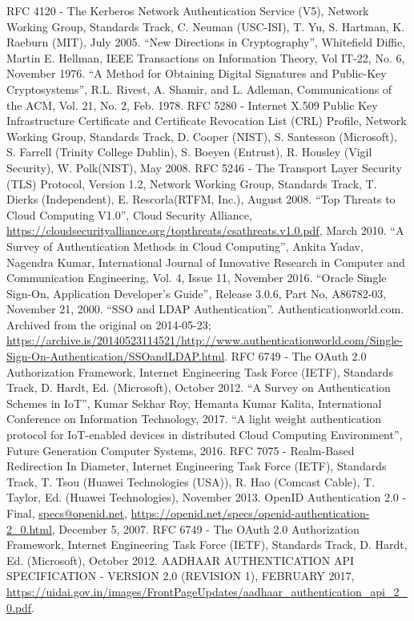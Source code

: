 \begin{multicols}{2}
\begin{thebibliography}{99}
 RFC 4120 - The Kerberos Network Authentication Service (V5), Network Working Group, Standards Track, C. Neuman (USC-ISI), T. Yu, S. Hartman, K. Raeburn (MIT), July 2005.
 ``New Directions in Cryptography'', Whitefield Diffie, Martin E. Hellman, IEEE Transactions on Information Theory, Vol IT-22, No. 6, November 1976.
 ``A Method for Obtaining Digital Signatures and Public-Key Cryptosystems'', R.L. Rivest, A. Shamir, and L. Adleman, Communications of the ACM, Vol. 21, No. 2, Feb. 1978.
 RFC 5280 - Internet X.509 Public Key Infrastructure Certificate and Certificate Revocation List (CRL) Profile, Network Working Group, Standards Track, D. Cooper (NIST), S. Santesson (Microsoft), S. Farrell (Trinity College Dublin), S. Boeyen (Entrust), R. Housley (Vigil Security), W. Polk(NIST), May 2008.
 RFC 5246 - The Transport Layer Security (TLS) Protocol, Version 1.2, Network Working Group, Standards Track, T. Dierks (Independent), E. Rescorla(RTFM, Inc.), August 2008.
 ``Top Threats to Cloud Computing V1.0'', Cloud Security Alliance, \url{https://cloudsecurityalliance.org/topthreats/csathreats.v1.0.pdf}, March 2010.
 ``A Survey of Authentication Methods in Cloud Computing'', Ankita Yadav, Nagendra Kumar, International Journal of Innovative Research in Computer and Communication Engineering, Vol. 4, Issue 11, November 2016.
 ``Oracle Single Sign-On, Application Developer's Guide'', Release 3.0.6, Part No, A86782-03, November 21, 2000.
 ``SSO and LDAP Authentication''. Authenticationworld.com. Archived from the original on 2014-05-23; \url{https://archive.is/20140523114521/http://www.authenticationworld.com/Single-Sign-On-Authentication/SSOandLDAP.html}.
 RFC 6749 - The OAuth 2.0 Authorization Framework, Internet Engineering Task Force (IETF), Standards Track, D. Hardt, Ed. (Microsoft), October 2012.
 ``A Survey on Authentication Schemes in IoT'', Kumar Sekhar Roy, Hemanta Kumar Kalita, International Conference on Information Technology, 2017.
 ``A light weight authentication protocol for IoT-enabled devices in distributed Cloud Computing Environment'', Future Generation Computer Systems, 2016.
 RFC 7075 - Realm-Based Redirection In Diameter, Internet Engineering Task Force (IETF), Standards Track, T. Tsou (Huawei Technologies (USA)), R. Hao (Comcast Cable), T. Taylor, Ed. (Huawei Technologies), November 2013.
 OpenID Authentication 2.0 - Final, \url{specs@openid.net}, \url{https://openid.net/specs/openid-authentication-2_0.html}, December 5, 2007.
 RFC 6749 - The OAuth 2.0 Authorization Framework, Internet Engineering Task Force (IETF), Standards Track, D. Hardt, Ed. (Microsoft), October 2012.
 AADHAAR AUTHENTICATION API SPECIFICATION - VERSION 2.0 (REVISION 1), FEBRUARY 2017, \url{https://uidai.gov.in/images/FrontPageUpdates/aadhaar_authentication_api_2_0.pdf}.
\end{thebibliography}
\end{multicols}
